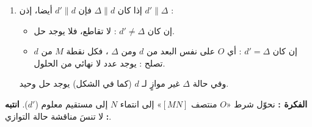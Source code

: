 \documentclass[12pt,a4paper]{article}
\begin{document}
\begin{corr}[title={نقطتان متناظرتان على مستقيمين}, stars=4, source={Axiomaths}]
\begin{enumerate}[itemsep=14pt]
  \item إذا كان $\Delta\parallel d$ فإن $d'\parallel d$ أيضا، إذن $d'\parallel\Delta$ :
  \begin{itemize}
    \item إن كان $d'\neq\Delta$ : لا تقاطع، فلا يوجد حل.
    \item إن كان $d'=\Delta$ : أي $O$ على نفس البعد من $d$ ومن $\Delta$ ، فكل نقطة $M$ من $d$ تصلح : يوجد عدد لا نهائي من الحلول.
  \end{itemize}
  وفي حالة $\Delta$ غير موازٍ لـ $d$ (كما في الشكل) يوجد حل وحيد.
\end{enumerate}
\textbf{الفكرة :} نحوّل شرط «$O$ منتصف $[MN]$» إلى انتماء $N$ إلى مستقيم معلوم ($d'$). \quad \textbf{انتبه :} لا تنسَ مناقشة حالة التوازي.
\end{corr}
\end{document}
